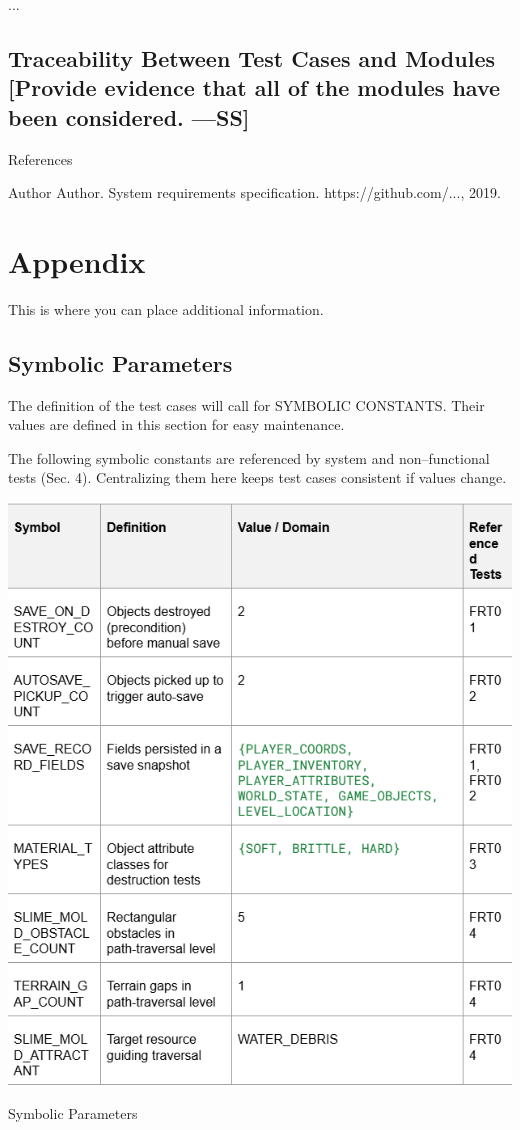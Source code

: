 \documentclass[12pt, titlepage]{article}
\begin{document}
...

\subsection{Traceability Between Test Cases and Modules [Provide evidence that all of the modules have been considered. —SS]}

References

Author Author. System requirements specification. https://github.com/..., 2019.

\section{Appendix}

This is where you can place additional information.

\subsection{Symbolic Parameters}

The definition of the test cases will call for SYMBOLIC CONSTANTS. Their values are defined in this section for easy maintenance.

The following symbolic constants are referenced by system and non--functional tests (Sec. 4). Centralizing them here keeps test cases consistent if values change.

\begin{table}[H]
\centering
\includegraphics[width=\linewidth, height=0.8\textheight, keepaspectratio]{table.png}
\caption{Symbolic Parameters}
\label{tab:symbolic--parameters}
\end{table}
\FloatBarrier %
\end{document}

